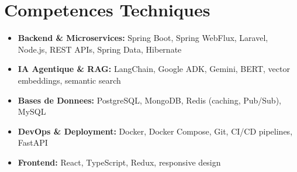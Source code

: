 \documentclass[a4paper,11pt]{article}
\begin{document}
\section{Competences Techniques}
\begin{itemize}[leftmargin=*, nosep]
    \item \small{\textbf{Backend \& Microservices:} Spring Boot, Spring WebFlux, Laravel, Node.js, REST APIs, Spring Data, Hibernate}
    \item \small{\textbf{IA Agentique \& RAG:} LangChain, Google ADK, Gemini, BERT, vector embeddings, semantic search}
    \item \small{\textbf{Bases de Donnees:} PostgreSQL, MongoDB, Redis (caching, Pub/Sub), MySQL}
    \item \small{\textbf{DevOps \& Deployment:} Docker, Docker Compose, Git, CI/CD pipelines, FastAPI}
    \item \small{\textbf{Frontend:} React, TypeScript, Redux, responsive design}
\end{itemize}
\end{document}
